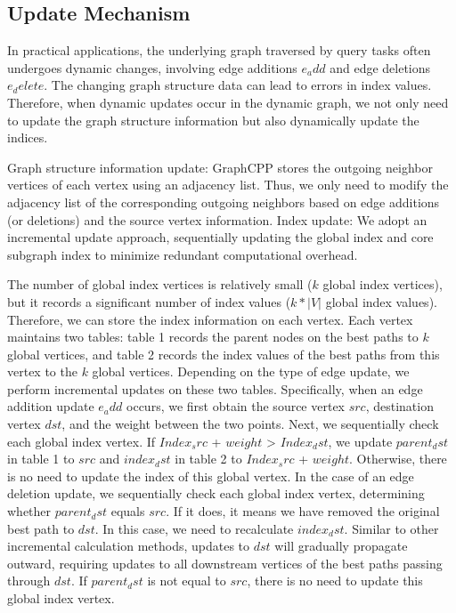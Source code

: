 \documentclass[lettersize,journal]{IEEEtran} %
\begin{document}
\subsection{Update Mechanism}
In practical applications, the underlying graph traversed by query tasks often undergoes dynamic changes, involving edge additions ${e_add}$ and edge deletions ${e_delete}$. The changing graph structure data can lead to errors in index values. Therefore, when dynamic updates occur in the dynamic graph, we not only need to update the graph structure information but also dynamically update the indices.

Graph structure information update: GraphCPP stores the outgoing neighbor vertices of each vertex using an adjacency list. Thus, we only need to modify the adjacency list of the corresponding outgoing neighbors based on edge additions (or deletions) and the source vertex information.
Index update: We adopt an incremental update approach, sequentially updating the global index and core subgraph index to minimize redundant computational overhead.

The number of global index vertices is relatively small ($k$ global index vertices), but it records a significant number of index values (${k*|V|}$ global index values). Therefore, we can store the index information on each vertex. Each vertex maintains two tables: table 1 records the parent nodes on the best paths to $k$ global vertices, and table 2 records the index values of the best paths from this vertex to the $k$ global vertices. Depending on the type of edge update, we perform incremental updates on these two tables. Specifically, when an edge addition update ${e_add}$ occurs, we first obtain the source vertex $src$, destination vertex $dst$, and the weight between the two points. Next, we sequentially check each global index vertex. If ${Index_src}$ + $weight$ > ${Index_dst}$, we update ${parent_dst}$ in table 1 to $src$ and ${index_dst}$ in table 2 to ${Index_src}$ + $weight$. Otherwise, there is no need to update the index of this global vertex. In the case of an edge deletion update, we sequentially check each global index vertex, determining whether ${parent_dst}$ equals $src$. If it does, it means we have removed the original best path to $dst$. In this case, we need to recalculate ${index_dst}$. Similar to other incremental calculation methods, updates to $dst$ will gradually propagate outward, requiring updates to all downstream vertices of the best paths passing through $dst$. If ${parent_dst}$ is not equal to $src$, there is no need to update this global index vertex.
\end{document}
